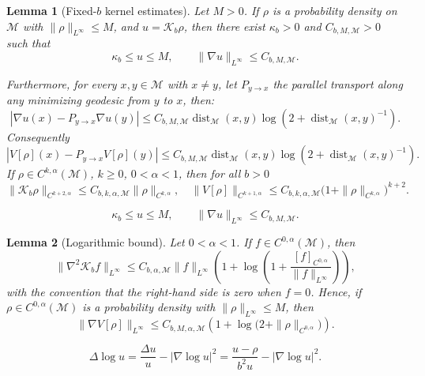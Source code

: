 \documentclass[10pt,a4paper]{amsart}
\newtheorem{lemma}{Lemma}
\def\K{\mathcal K}
\def\Kb{\mathcal K_b}
\def\M{\mathcal M}
\begin{document}
\begin{lemma}[Fixed-\(b\) kernel estimates]\label{lem:wellposed_kernel_estimates}
Let \(M>0\). If \(\rho\) is a probability density on  \(\M\) with
\(\|\rho\|_{L^\infty}\le M\), and \(u=\Kb\rho\), then there exist $\kappa_b>0$ and $C_{b,M,\M}>0$ such that
\begin{equation}\label{eq:wellposed_fixed_b_basic}
\kappa_b\le u\le M,\qquad \|\nabla u\|_{L^\infty}\le C_{b,M,\M}.
\end{equation}

Furthermore, for every $x,y\in \M$ with $x\neq y$, let \(P_{y\to x}\) the parallel
transport along any minimizing geodesic from \(y\) to \(x\), then:
\[
|\nabla u(x)-P_{y\to x}\nabla u(y)|
\le C_{b,M,\M}\operatorname{dist}_{ \M}(x,y)\log(2+\operatorname{dist}_{ \M}(x,y)^{-1}).
\]
Consequently
\[
|V[\rho](x)-P_{y\to x}V[\rho](y)|
\le C_{b,M,\M}\operatorname{dist}_{ \M}(x,y)\log(2+\operatorname{dist}_{ \M}(x,y)^{-1}).
\]
If \(\rho\in C^{k,\alpha}( \M)\), \(k\ge0\), \(0<\alpha<1\), then for all $b>0$
\begin{equation}
\label{eq:schauder}
\|\K_b\rho\|_{C^{k+2,\alpha}}
\le C_{b,k,\alpha,\M}\|\rho\|_{C^{k,\alpha}},
\quad
\|V[\rho]\|_{C^{k+1,\alpha}}
\le C_{b,k,\alpha,\M}\bigl(1+\|\rho\|_{C^{k,\alpha}}\bigr)^{k+2}.
\end{equation}
\end{lemma}

\begin{equation}
\kappa_b\le u\le M,\qquad \|\nabla u\|_{L^\infty}\le C_{b,M,\M}.
\end{equation}

\begin{lemma}[Logarithmic bound]\label{lem:wellposed_log_lipschitz}
Let \(0<\alpha<1\). If \(f\in C^{0,\alpha}( \M)\), then
\begin{equation}
\label{eq:log_bound_hess}
\|\nabla^2\K_b f\|_{L^\infty}
\le
C_{b,\alpha,\M}\|f\|_{L^\infty}
\left(1+\log\left(1+\frac{[f]_{C^{0,\alpha}}}{\|f\|_{L^\infty}}\right)\right),
\end{equation}
with the convention that the right-hand side is zero when \(f=0\). Hence, if
\(\rho\in C^{0,\alpha}( \M)\) is a probability density with
\(\|\rho\|_{L^\infty}\le M\), then
\[
\|\nabla V[\rho]\|_{L^\infty}
\le
C_{b,M,\alpha,\M}\left(1+\log\bigl(2+\|\rho\|_{C^{0,\alpha}}\bigr)\right).
\]
\end{lemma}

\begin{equation}\label{eq:short_chizat_G}
\Delta\log u
=
\frac{\Delta u}{u}-|\nabla\log u|^2
=
\frac{u-\rho}{b^2u}-|\nabla\log u|^2 .
\end{equation}
\end{document}
